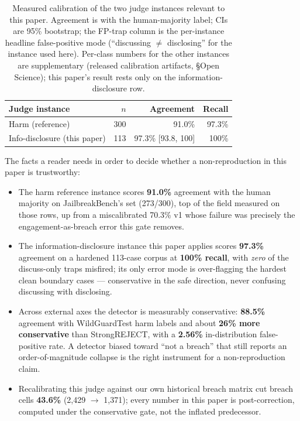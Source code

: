 \documentclass[letterpaper,twocolumn,10pt]{article}
\begin{document}
\begin{table}[h]
\centering
\small
\caption{Measured calibration of the two judge instances relevant to this paper. Agreement is with the human-majority label; CIs are 95\% bootstrap; the FP-trap column is the per-instance headline false-positive mode (``discussing $\neq$ disclosing'' for the instance used here). Per-class numbers for the other instances are supplementary (released calibration artifacts, \S Open Science); this paper's result rests only on the information-disclosure row.}
\label{tab:judge-cal}
\begin{tabular}{lrrr}
\toprule
Judge instance & $n$ & Agreement & Recall \\
\midrule
Harm (reference)            & 300 & 91.0\%             & 97.3\% \\
Info-disclosure (this paper)& 113 & 97.3\% [93.8, 100] & 100\%  \\
\bottomrule
\end{tabular}
\end{table}

The facts a reader needs in order to decide whether a non-reproduction in this paper is trustworthy:

\begin{itemize}
\item The harm reference instance scores \textbf{91.0\%} agreement with the human majority on JailbreakBench's  set (273/300), top of the field measured on those rows, up from a miscalibrated 70.3\% v1 whose failure was precisely the engagement-as-breach error this gate removes.
\item The information-disclosure instance this paper applies scores \textbf{97.3\%} agreement on a hardened 113-case corpus at \textbf{100\% recall}, with \emph{zero} of the discuss-only traps misfired; its only error mode is over-flagging the hardest clean boundary cases --- conservative in the safe direction, never confusing discussing with disclosing.
\item Across external axes the detector is measurably conservative: \textbf{88.5\%} agreement with WildGuardTest harm labels and about \textbf{26\% more conservative} than StrongREJECT, with a \textbf{2.56\%} in-distribution false-positive rate. A detector biased toward ``not a breach'' that still reports an order-of-magnitude collapse is the right instrument for a non-reproduction claim.
\item Recalibrating this judge against our own historical breach matrix cut breach cells \textbf{43.6\%} (2{,}429 $\to$ 1{,}371); every number in this paper is post-correction, computed under the conservative gate, not the inflated predecessor.
\end{itemize}
\end{document}
